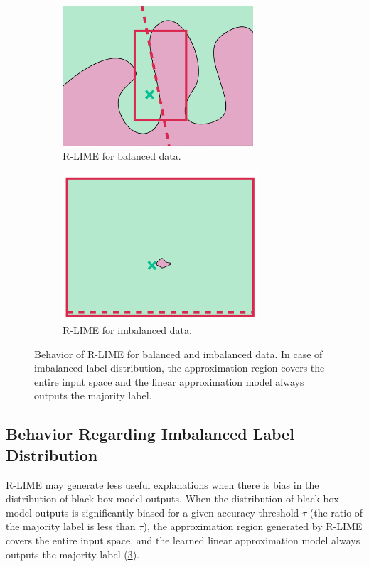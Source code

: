 \documentclass[runningheads]{llncs}
\begin{document}
 {%
  \def\imgwidth{0.49\textwidth}
  \begin{figure}[t]
    \centering
    \begin{subfigure}[t]{\imgwidth}
      \centering
      \includegraphics[width=0.78\textwidth]{newlime}
      \caption{R-LIME for balanced data.}\label{fig:balanced}
    \end{subfigure}
    \begin{subfigure}[t]{\imgwidth}
      \centering
      \includegraphics[width=0.8\textwidth]{newlime_for_imbalanced_data}
      \caption{R-LIME for imbalanced data.
      }\label{fig:imbalanced}
    \end{subfigure}
    \caption{%
      Behavior of R-LIME for balanced and imbalanced data.
      In case of imbalanced label distribution,
      the approximation region covers the entire input space and the
      linear approximation model always outputs the majority label.
    }
    \vspace{10pt}
  \end{figure}
 }

\subsection{Behavior Regarding Imbalanced Label Distribution}
R-LIME may generate less useful explanations when there is bias in the distribution of black-box model outputs. When the distribution of black-box model outputs is significantly biased for a given accuracy threshold $\tau$ (the ratio of the majority label is less than $\tau$), the approximation region generated by R-LIME covers the entire input space, and the learned linear approximation model always outputs the majority label (\cref{fig:imbalanced}).
\end{document}
